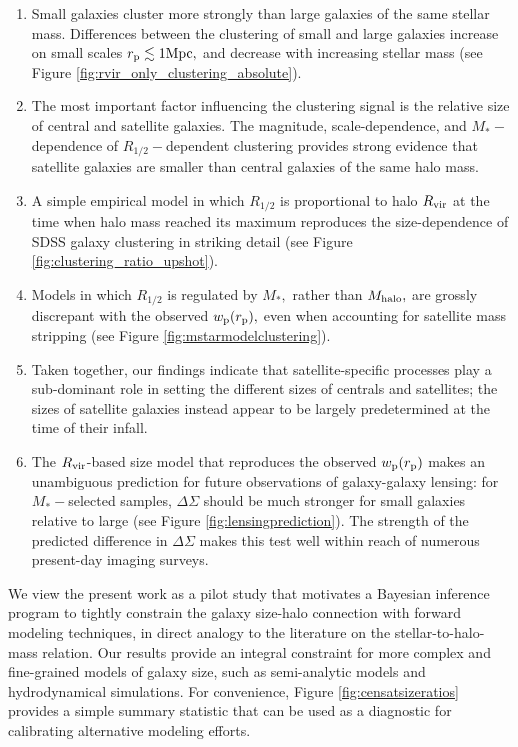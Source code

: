 \documentclass[usenatbib,usegraphicx,letterpaper]{mn2e}
\newcommand{\ben}{\begin{enumerate}}
\newcommand{\een}{\end{enumerate}}
\newcommand{\rhalf}{R_{1/2}}
\newcommand{\mstar}{M_{\ast}}
\newcommand{\mhalo}{M_{\rm halo}}
\newcommand{\rvir}{R_{\rm vir}}
\newcommand{\rproj}{r_{\rm p}}
\newcommand{\wproj}{w_{\rm p}}
\newcommand{\mpc}{{\rm Mpc}}
\begin{document}
\ben
\item Small galaxies cluster more strongly than large galaxies of the same stellar mass. Differences between the clustering of small and large galaxies increase on small scales $\rproj\lesssim1\mpc,$ and decrease with increasing stellar mass (see Figure \ref{fig:rvir_only_clustering_absolute}). 
\item The most important factor influencing the clustering signal is the relative size of central and satellite galaxies. The magnitude, scale-dependence, and $\mstar-$dependence of $\rhalf-$dependent clustering provides strong evidence that satellite galaxies are smaller than central galaxies of the same halo mass.
\item A simple empirical model in which $\rhalf$ is proportional to halo $\rvir$ at the time when halo mass reached its maximum reproduces the size-dependence of SDSS galaxy clustering in striking detail (see Figure \ref{fig:clustering_ratio_upshot}). 
\item Models in which $\rhalf$ is regulated by $\mstar,$ rather than $\mhalo,$ are grossly discrepant with the observed $\wproj(\rproj),$ even when accounting for satellite mass stripping (see Figure \ref{fig:mstarmodelclustering}).
\item Taken together, our findings indicate that satellite-specific processes play a sub-dominant role in setting the different sizes of centrals and satellites; the sizes of satellite galaxies instead appear to be largely predetermined at the time of their infall.
\item The $\rvir$-based size model that reproduces the observed $\wproj(\rproj)$ makes an unambiguous  prediction for future observations of galaxy-galaxy lensing: for $\mstar-$selected samples, $\Delta\Sigma$ should be much stronger for small galaxies relative to large (see Figure \ref{fig:lensingprediction}). The strength of the predicted difference in $\Delta\Sigma$ makes this test well within reach of numerous present-day imaging surveys. 
\een

We view the present work as a pilot study that motivates a Bayesian inference program to tightly constrain the galaxy size-halo connection with forward modeling techniques, in direct analogy to the literature on the stellar-to-halo-mass relation.
Our results provide an integral constraint for more complex and fine-grained models of galaxy size, such as semi-analytic models and hydrodynamical simulations. For convenience, Figure \ref{fig:censatsizeratios} provides a simple summary statistic that can be used as a diagnostic for calibrating alternative modeling efforts. 
\end{document}
